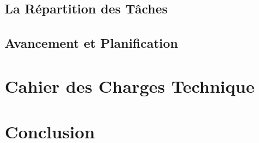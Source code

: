 \documentclass[11pt]{article}
\begin{document}
\subsection{La Répartition des Tâches}



\subsection{Avancement et Planification}





\section{Cahier des Charges Technique}



\newpage
\section{Conclusion}


\end{document}
